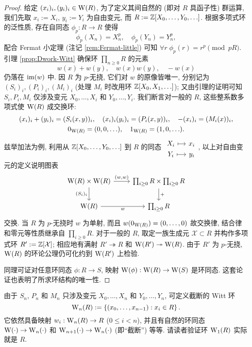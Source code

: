 \begin{proof}
	给定 $(x_i)_i, (y_i)_i \in \operatorname{W}(R)$, 为了定义其间自然的 (即对 $R$ 具函子性) 群运算, 我们先取 $x_i := X_i$, $y_i := Y_i$ 为自由变元, 而 $R := \mathbb{Z}[X_0, \ldots, Y_0, \ldots]$. 根据多项式环的泛性质, 存在自同态 $\phi_p: R \to R$ 使得
	\[ \phi_p(X_n) = X_n^p, \quad \phi_p(Y_n) = Y_n^p, \]
	配合 Fermat 小定理 (注记 \ref{rem:Fermat-little}) 可知 $\forall r \; \phi_p(r) = r^p \pmod{pR}$. 引理 \ref{prop:Dwork-Witt} 确保环 $\prod_{n \geq 0} R$ 的元素
	\[ w(x) + w(y), \quad w(x)w(y), \quad -w(x) \]
	仍落在 $\operatorname{im}(w)$ 中. 因 $R$ 为 $p$-无挠, 它们对 $w$ 的原像皆唯一, 分别记为 $(S_i)_i, (P_i)_i, (M_i)_i$ (处理 $M_i$ 时改用环 $\mathbb{Z}[X_0, X_1, \ldots]$); 又由引理的证明可知 $S_i, P_i, M_i$ 仅涉及变元 $X_0, \ldots, X_i$ 和 $Y_0, \ldots, Y_i$. 我们断言对一般的 $R$, 这些整系数多项式使 $\operatorname{W}(R)$ 成交换环:
	\begin{gather*}
		(x_i)_i + (y_i)_i = (S_i(x,y))_i, \quad (x_i)_i (y_i)_i = (P_i(x,y))_i, \quad  -(x_i)_i = (M_i(x))_i, \\
		0_{\operatorname{W}(R)} = (0,0, \ldots), \quad 1_{\operatorname{W}(R)} = (1,0,\ldots).
	\end{gather*}
	兹举加法为例, 利用从 $\mathbb{Z}[X_0, \ldots, Y_0, \ldots]$ 到 $R$ 的同态
	$\begin{tikzcd}[row sep=0pt, column sep=small] X_i \arrow[mapsto, r] & x_i \\ Y_i \arrow[mapsto, r] & y_i \end{tikzcd}$,
	以上对自由变元的定义说明图表
	\[\begin{tikzcd}
		\WittV(R) \times \WittV(R) \arrow[d, "{(S_i)_i}"'] \arrow[r, "{(w,w)}"] & \prod_{i \geq 0} R  \times \prod_{i \geq 0} R \arrow[d, "+"] \\
		\WittV(R) \arrow[r, "w"'] & \prod_{i \geq 0} R
	\end{tikzcd}\]
	交换. 当 $R$ 为 $p$-无挠时 $w$ 为单射, 而且 $w(0_{\operatorname{W}(R)}) = (0, \ldots, 0)$ 故交换律, 结合律和零元等性质继承自 $\prod_{i \geq 0} R$. 对于一般的 $R$, 取定一族生成元 $\mathcal{X} \subset R$ 并构作多项式环 $R' := \mathbb{Z}[\mathcal{X}]$; 相应地有满射 $R' \twoheadrightarrow R$ 和 $\operatorname{W}(R') \twoheadrightarrow \operatorname{W}(R)$. 由于 $R'$ 为 $p$-无挠, $\operatorname{W}(R)$ 的环论公理仍可化约到 $\operatorname{W}(R')$ 上检验.
	
	同理可证对任意环同态 $\phi: R \to S$, 映射 $\operatorname{W}(\phi): \operatorname{W}(R) \to \operatorname{W}(S)$ 是环同态. 这套论证也表明了所求环结构的唯一性.
\end{proof}

由于 $S_n$, $P_n$ 和 $M_n$ 只涉及变元 $X_0, \ldots, X_n$ 和 $Y_0, \ldots, Y_n$, 可定义截断的 Witt 环 
\[ \operatorname{W}_n(R)  := \left\{ (x_0, \ldots, x_{n-1}) : x_i \in R \right\}. \]
它依然具备映射 $w_i: \operatorname{W}_n(R) \to R$ ($0 \leq i < n$), 并且有自然的环同态 $\operatorname{W}(\cdot) \to \operatorname{W}_n(\cdot)$ 和 $\operatorname{W}_{n+1}(\cdot) \to \operatorname{W}_n(\cdot)$ (即``截断'') 等等. 请读者验证环 $\operatorname{W}_1(R)$ 实际就是 $R$.

